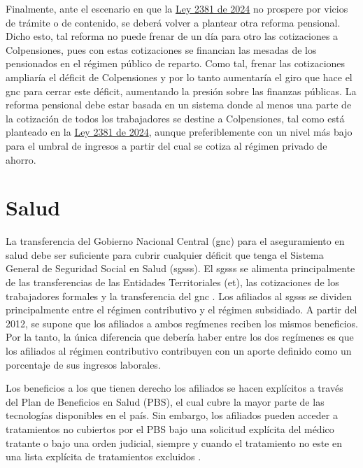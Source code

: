 Finalmente, ante el escenario en que  la \href{https://www.funcionpublica.gov.co/eva/gestornormativo/norma.php?i=246356}{Ley 2381 de 2024} no prospere por vicios de trámite o de contenido, se deberá volver a plantear otra reforma pensional. Dicho esto, tal reforma no puede frenar de un día para otro las cotizaciones a Colpensiones, pues con estas cotizaciones se financian las mesadas de los pensionados en el régimen público de reparto. Como tal, frenar las cotizaciones ampliaría el déficit de Colpensiones y por lo tanto aumentaría el giro que hace el \gls{gnc} para cerrar este déficit, aumentando la presión sobre las finanzas públicas. La reforma pensional debe estar basada en un sistema donde al menos una parte de la cotización de todos los trabajadores se destine a Colpensiones, tal como está planteado en la \href{https://www.funcionpublica.gov.co/eva/gestornormativo/norma.php?i=246356}{Ley 2381 de 2024}, aunque preferiblemente con un nivel más bajo para el umbral de ingresos a partir del cual se cotiza al régimen privado de ahorro.   


\section{Salud}

La transferencia del Gobierno Nacional Central (\gls{gnc}) para el aseguramiento en salud debe ser suficiente para cubrir cualquier déficit que tenga el Sistema General de Seguridad Social en Salud (\gls{sgsss}). El \gls{sgsss} se alimenta principalmente de las transferencias de las Entidades Territoriales (\gls{et}), las cotizaciones de los trabajadores formales y la transferencia del \gls{gnc}%
. Los afiliados al \gls{sgsss} se dividen principalmente entre el régimen contributivo y el régimen subsidiado. A partir del 2012, se supone que los afiliados a ambos regímenes reciben los mismos beneficios. Por la tanto, la única diferencia que debería haber entre los dos regímenes es que los afiliados al régimen contributivo contribuyen con un aporte definido como un porcentaje de sus ingresos laborales.

Los beneficios a los que tienen derecho los afiliados se hacen explícitos a través del Plan de Beneficios en Salud (PBS), el cual cubre la mayor parte de las tecnologías disponibles en el país. Sin embargo, los afiliados pueden acceder a tratamientos no cubiertos por el PBS bajo una solicitud explícita del médico tratante o bajo una orden judicial, siempre y cuando el tratamiento no este en una lista explícita de tratamientos excluidos%
. 

